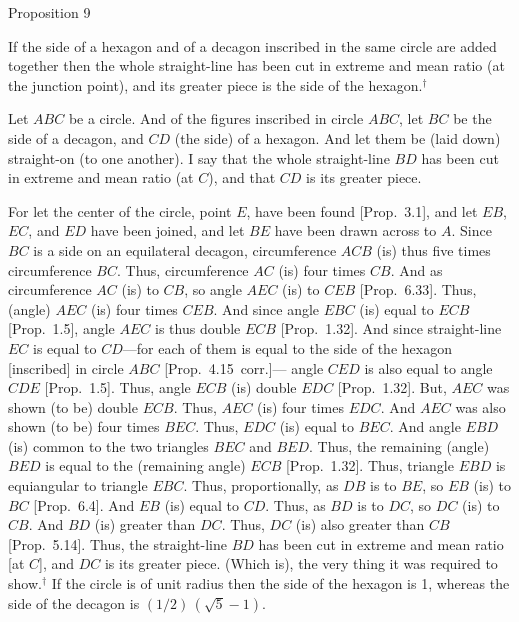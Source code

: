 \begin{center}
{\large Proposition 9}
\end{center}

If the side of a hexagon and  of a decagon inscribed in the same circle
are added together then the whole straight-line has been cut in extreme and
mean ratio (at the junction point), and its greater piece is the side of the hexagon.$^\dag$

\epsfysize=2.25in
\centerline{}

Let $ABC$ be a circle. And of the figures inscribed in circle $ABC$, 
let $BC$ be the side of a decagon, and $CD$ (the side) of a hexagon.
And let them be (laid down) straight-on (to one another). I say that
the whole straight-line $BD$ has been cut in extreme and mean
ratio (at $C$), and that   $CD$ is its greater piece. 

For let the center of the circle, point $E$, have been found [Prop.~3.1],
and let $EB$, $EC$, and $ED$ have been joined, and let $BE$ have been
drawn across to $A$. Since $BC$ is a side on an equilateral decagon,
circumference $ACB$ (is) thus five times circumference $BC$. Thus,
circumference $AC$ (is) four times $CB$. And as circumference $AC$
(is) to $CB$, so angle $AEC$ (is) to $CEB$ [Prop.~6.33]. Thus,
(angle) $AEC$ (is) four times $CEB$. And since angle $EBC$
(is) equal to $ECB$ [Prop.~1.5], angle $AEC$ is thus double $ECB$ [Prop.~1.32]. 
And since straight-line $EC$ is equal to $CD$---for each of them is equal
to the side of the hexagon [inscribed] in circle $ABC$ [Prop.~4.15~corr.]---
angle $CED$ is also equal to angle $CDE$ [Prop.~1.5]. Thus,
angle $ECB$ (is) double $EDC$ [Prop.~1.32]. But,
$AEC$ was shown (to be) double $ECB$. Thus, $AEC$ (is) four times
$EDC$. And $AEC$ was also shown (to be) four times $BEC$. 
Thus, $EDC$ (is) equal to $BEC$. And angle $EBD$ (is) common
to the two triangles $BEC$ and $BED$. Thus, the remaining (angle)
$BED$ is equal to the (remaining angle) $ECB$ [Prop.~1.32]. 
Thus, triangle $EBD$ is equiangular to triangle $EBC$. Thus,
proportionally, as $DB$ is to $BE$, so $EB$ (is) to $BC$ [Prop.~6.4].
And $EB$ (is) equal to $CD$. Thus, as $BD$ is to $DC$, so $DC$
(is) to $CB$. And $BD$ (is) greater than $DC$. Thus,
$DC$ (is) also greater than $CB$ [Prop.~5.14]. Thus, the
straight-line $BD$ has been cut in extreme and mean ratio [at $C$],
and $DC$  is its greater piece. (Which is), the very thing it was required to show.{\footnotesize\noindent$^\dag$ If the circle is of unit radius
then the side of the hexagon is 1, whereas the side of the decagon is $(1/2)\,(\sqrt{5}-1)$.}

